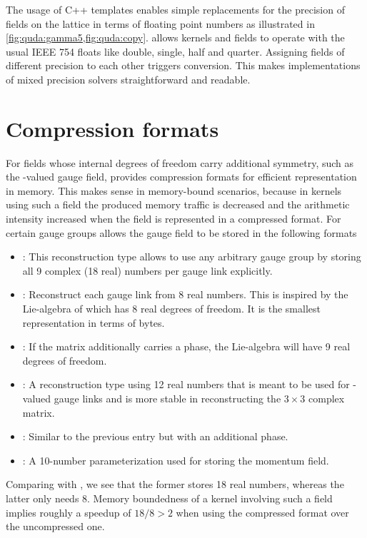 The usage of C++ templates enables simple replacements for the precision of fields on the lattice in terms of floating point numbers as illustrated in \cref{fig:quda:gamma5,fig:quda:copy}. \Quda allows kernels and fields to operate with the usual IEEE 754 floats like double, single, half and quarter. Assigning fields of different precision to each other triggers conversion. This makes implementations of mixed precision solvers straightforward and readable.

\section{Compression formats}
\label{quda:compresed:formats}

For fields whose internal degrees of freedom carry additional symmetry, such as the -valued gauge field, \quda provides compression formats for efficient representation in memory.
This makes sense in memory-bound scenarios, because in kernels using such a field the produced memory traffic is decreased and the arithmetic intensity increased when the field is represented in a compressed format.
For certain gauge groups \quda allows the gauge field to be stored in the following formats
\begin{itemize}
  \item {}: This reconstruction type allows to use any arbitrary gauge group by storing all \num{9} complex (\num{18} real) numbers per gauge link explicitly.
  \item {}: Reconstruct each gauge link from \num{8} real numbers. This is inspired by the Lie-algebra of  which has \num{8} real degrees of freedom. It is the smallest representation in terms of bytes.
  \item {}: If the  matrix additionally carries a  phase, the Lie-algebra will have \num{9} real degrees of freedom.
  \item {}: A reconstruction type using \num{12} real numbers that is meant to be used for -valued gauge links and is more stable in reconstructing the $3 \times 3$ complex matrix.
  \item {}: Similar to the previous entry but with an additional  phase.
  \item {}: A \num{10}-number parameterization used for storing the momentum field.
\end{itemize}
Comparing  with , we see that the former stores \num{18} real numbers, whereas the latter only needs \num{8}. Memory boundedness of a kernel involving such a field implies roughly a speedup of $18/8 > 2$ when using the compressed format over the uncompressed one.

